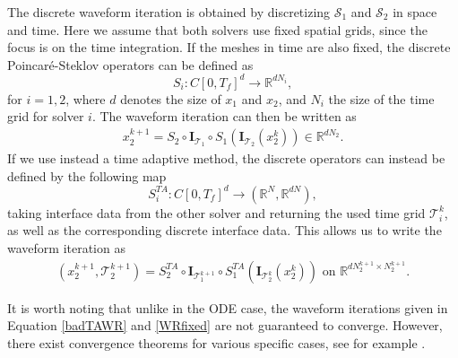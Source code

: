 The discrete waveform iteration is obtained by discretizing $ \mathcal{S}_1$ and $ \mathcal{S}_2$ in space and time. Here we assume that both solvers use fixed spatial grids, since the focus is on the time integration. If the meshes in time are also fixed, the discrete Poincaré-Steklov operators can be defined as 
\begin{equation*}
	S_i: C[0,T_f]^d \xrightarrow{} \mathbb{R}^{d N_i},
\end{equation*}  
for $i = 1,2$, where $d$ denotes the size of $x_1$ and $x_2$, and $N_i$ the size of the time grid for solver $i$. The waveform iteration can then be written as
\begin{align}\label{WRfixed}
	x_2^{k+1} = S_2 \circ \mathbf{I}_{\mathcal{T}_1} \circ S_1 \left( \mathbf{I}_{\mathcal{T}_2}\left(x_2^k\right) \right) \in \mathbb{R}^{d N_2}.
\end{align}
If we use instead a time adaptive method, the discrete operators can instead be defined by the following map
\begin{equation*}
	S^{TA}_i: C[0,T_f]^d \xrightarrow{} (\mathbb{R}^N,\mathbb{R}^{d N}),
\end{equation*} taking interface data from the other solver and returning the used time grid $\mathcal{T}_i^k$, as well as the corresponding discrete interface data. This allows us to write the waveform iteration as \begin{align}\label{badTAWR}
	\left(x_2^{k+1}, \mathcal{T}_2^{k+1} \right) = S^{TA}_2 \circ \mathbf{I}_{\mathcal{T}^{k+1}_1} \circ S^{TA}_1 \left( \mathbf{I}_{\mathcal{T}^{k}_2}\left(x_2^k\right) \right) \text{ on } \mathbb{R}^{d N^{k+1}_2 \times N^{k+1}_2}.
\end{align}


It is worth noting that unlike in the ODE case, the waveform iterations given in Equation \eqref{badTAWR} and \eqref{WRfixed} are not guaranteed to converge. 
However, there exist convergence theorems for various specific cases, see for example  \cite{gakwma:16,JaVa96a, JaVa96b}.

